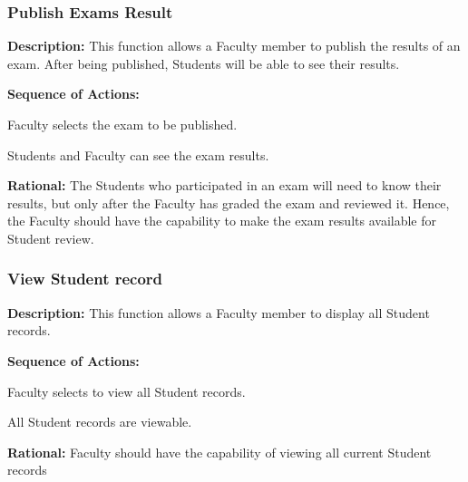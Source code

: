    \subsubsection{\large Publish Exams Result} 
   \begin{boxed} %
      \textbf{Description:}
      {\small This function allows a Faculty member to publish the results of an
         exam. After being published, Students will be able to see their
         results.}
         
         \textbf{Sequence of Actions:}
         \begin{enumerate}
               {\small
            \item Faculty selects the exam to be published.
            \item Students and Faculty can see the exam results.}
      \end{enumerate}

         \textbf{Rational:}
         {\small The Students who participated in an exam will need to know their
         results, but only after the Faculty has graded the exam and reviewed
         it. Hence, the Faculty should have the capability to make the exam
         results available for Student review.}
   \end{boxed} %

   \subsubsection{\large View Student record} 
   \begin{boxed} %
      \textbf{Description:}
      {\small This function allows a Faculty member to display all Student
         records.}
         
         \textbf{Sequence of Actions:}
         \begin{enumerate}
               {\small
            \item Faculty selects to view all Student records.
            \item All Student records are viewable.}
      \end{enumerate}

         \textbf{Rational:}
         {\small Faculty should have the capability of viewing all current Student
         records}
   \end{boxed} %

